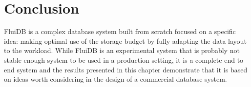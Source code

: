 \section{Conclusion}

FluiDB is a complex database system built from scratch focused on a
specific idea: making optimal use of the storage budget by fully
adapting the data layout to the workload. While FluiDB is an
experimental system that is probably not stable enough system to be
used in a production setting, it is a complete end-to-end system and
the results presented in this chapter demonstrate that it is based on
ideas worth considering in the design of a commercial database system.
